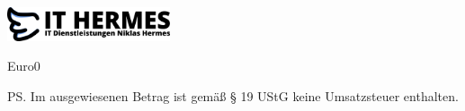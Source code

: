 \documentclass[a4paper]{scrlttr2}
\begin{document}
	\begin{letter}{ \customerCompany \hfill \shippingCompany \\
					\customerName \hfill \shippingName \\
					\customerExtended \hfill \shippingExtended \\
					\customerStreet \hfill \shippingStreet \\
					\customerZIP \ \customerCity \hfill \shippingZIP \ \shippingCity \\
					\customerEmail}
	
				\includegraphics[width=0.36\textwidth]{logo.eps}			
			\opening{\invoiceSalutation}
			\invoiceText
		    \begin{invoice}{Euro}{0}
			    
		    \end{invoice}
		\ps Im ausgewiesenen Betrag ist gemäß § 19 UStG keine Umsatzsteuer 
		enthalten.

		\closing{\invoiceClosing}
		\invoiceEnclosures

	\end{letter}
\end{document}
